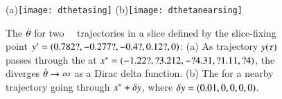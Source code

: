 


 \begin{figure}
 \begin{center}
(a)\texttt{[image: dthetasing]}%
(b)\texttt{[image: dthetanearsing]}%
 \end{center}
 \caption{\label{fig:dthetasing}
The {\groupVel} $\dot{{\bf \theta}}$ for two \cLf\
\reducedsp\ trajectories in a slice defined by the slice-fixing
point ${y'}=(0.782?,-0.277?,-0.4?,0.12?,0)$:
 (a) As trajectory $y(\tau)$ passes through the
{\sset} 
 at $x^*=(-1.22?, ?3.212, -?4.31, ?1.11, ?4)$,
the {\groupVel} diverges
$\dot{{\bf \theta}} \to \infty$ as a Dirac delta function.
(b) The {\groupVel} for a nearby trajectory going
through $x^*+\delta y$,
where $\delta y=(0.01,0,0,0,0)$.
 }%
 \end{figure}

